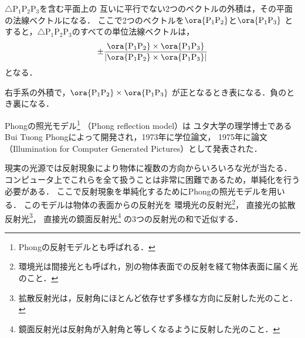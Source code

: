 
\homework



$\triangle\mathrm{P}_{1}\mathrm{P}_{2}\mathrm{P}_{3}$を含む平面上の
互いに平行でない2つのベクトルの外積は，その平面の法線ベクトルになる．
ここで2つのベクトルを$\ora{\mathrm{P}_{1}\mathrm{P}_{2}}$と$\ora{\mathrm{P}_{1}\mathrm{P}_{3}}$
とすると，$\triangle\mathrm{P}_{1}\mathrm{P}_{2}\mathrm{P}_{3}$のすべての単位法線ベクトルは，
\begin{align*}
	\pm
	\frac{
		\ora{\mathrm{P}_{1}\mathrm{P}_{2}} \times \ora{\mathrm{P}_{1}\mathrm{P}_{3}}
	}{
		\left|\ora{\mathrm{P}_{1}\mathrm{P}_{2}} \times \ora{\mathrm{P}_{1}\mathrm{P}_{3}}\right|
	}
\end{align*}
となる．



右手系の外積で，$\ora{\mathrm{P}_{1}\mathrm{P}_{2}} \times \ora{\mathrm{P}_{1}\mathrm{P}_{3}}$
が正となるとき表になる．負のとき裏になる．





Phongの照光モデル\footnote{Phongの反射モデルとも呼ばれる．}
（Phong reflection model）は
ユタ大学の理学博士であるBui Tuong Phongによって開発され，1973年に学位論文\cite{Utah}，
1975年に論文（Illumination for Computer Generated Pictures）\cite{Bui}として発表された．



現実の光源では反射現象により物体に複数の方向からいろいろな光が当たる．
コンピュータ上でこれらを全て扱うことは非常に困難であるため，単純化を行う必要がある．
ここで反射現象を単純化するためにPhongの照光モデルを用いる．
このモデルは物体の表面からの反射光を
環境光の反射光\footnote{環境光は間接光とも呼ばれ，別の物体表面での反射を経て物体表面に届く光のこと．}，
直接光の拡散反射光\footnote{拡散反射光は，反射角にほとんど依存せず多様な方向に反射した光のこと．}，
直接光の鏡面反射光\footnote{鏡面反射光は反射角が入射角と等しくなるように反射した光のこと．}
の3つの反射光の和で近似する．

